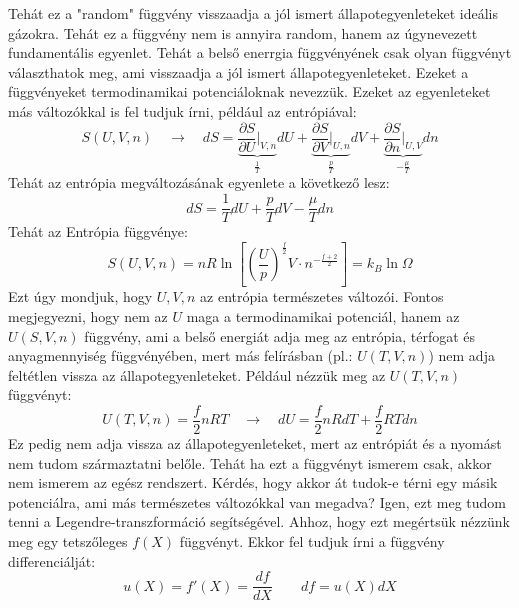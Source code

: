 \documentclass[a4paper,12pt]{article}
\begin{document}
Tehát ez a "random" függvény visszaadja a jól ismert állapotegyenleteket ideális gázokra. Tehát ez a függvény nem is annyira random, hanem az úgynevezett fundamentális egyenlet.
Tehát a belső enerrgia függvényének csak olyan függvényt választhatok meg, ami visszaadja a jól ismert állapotegyenleteket. Ezeket a függvényeket termodinamikai potenciáloknak nevezzük.
\newline
\newline
Ezeket az egyenleteket más változókkal is fel tudjuk írni, például az entrópiával:
\begin{equation}
    S(U, V, n) \quad \to \quad dS = \underbrace{\frac{\partial S}{\partial U}\bigg|_{V,n}}_{\frac{1}{T}} dU + \underbrace{\frac{\partial S}{\partial V}\bigg|_{U,n}}_{\frac{p}{T}} dV + \underbrace{\frac{\partial S}{\partial n}\bigg|_{U,V}}_{- \frac{\mu}{T}} dn
\end{equation}
Tehát az entrópia megváltozásának egyenlete a következő lesz:
\begin{equation}
    dS = \frac{1}{T} dU + \frac{p}{T} dV - \frac{\mu}{T} dn
\end{equation}
Tehát az Entrópia függvénye:
\begin{equation}
    S(U, V, n) = n R \ln{\left[\left(\frac{U}{p}\right)^{\frac{f}{2}} V \cdot n^{-\frac{f + 2}{2}} \right]} = k_B \ln{\Omega}
\end{equation}
Ezt úgy mondjuk, hogy $U, V, n$ az entrópia természetes változói.
\newline
\newline
Fontos megjegyezni, hogy nem az $U$ maga a termodinamikai potenciál, hanem az $U(S, V, n)$ függvény, ami a belső energiát adja meg az entrópia, térfogat és anyagmennyiség függvényében,
mert más felírásban (pl.: $U(T,V, n)$) nem adja feltétlen vissza az állapotegyenleteket. Például nézzük meg az $U(T, V, n)$ függvényt:
\begin{equation}
    U(T, V, n) = \frac{f}{2} n R T \quad \to \quad dU = \frac{f}{2} n R dT + \frac{f}{2} R T dn
\end{equation}
Ez pedig nem adja vissza az állapotegyenleteket, mert az entrópiát és a nyomást nem tudom származtatni belőle. Tehát ha ezt a függvényt ismerem csak,
akkor nem ismerem az egész rendszert. Kérdés, hogy akkor át tudok-e térni egy másik potenciálra, ami más természetes változókkal van megadva?
Igen, ezt meg tudom tenni a Legendre-transzformáció segítségével. Ahhoz, hogy ezt megértsük nézzünk meg egy tetszőleges $f(X)$ függvényt. Ekkor fel tudjuk írni a függvény differenciálját:
\begin{equation}
    u(X) = f'(X) = \frac{df}{dX} \qquad df = u(X) dX
\end{equation}
\end{document}
